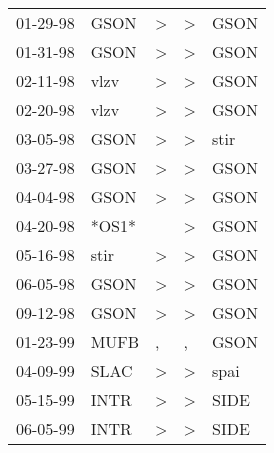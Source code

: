 \begin{supertabular}{lllll}
 01-29-98 &   GSON &  \textgreater &  \textgreater &  GSON \\
 01-31-98 &   GSON &  \textgreater &  \textgreater &  GSON \\
 02-11-98 &   vlzv &  \textgreater &  \textgreater &  GSON \\
 02-20-98 &   vlzv &  \textgreater &  \textgreater &  GSON \\
 03-05-98 &   GSON &  \textgreater &  \textgreater &  stir \\
 03-27-98 &   GSON &  \textgreater &  \textgreater &  GSON \\
 04-04-98 &   GSON &  \textgreater &  \textgreater &  GSON \\
 04-20-98 &  *OS1* &               &  \textgreater &  GSON \\
 05-16-98 &   stir &  \textgreater &  \textgreater &  GSON \\
 06-05-98 &   GSON &  \textgreater &  \textgreater &  GSON \\
 09-12-98 &   GSON &  \textgreater &  \textgreater &  GSON \\
 01-23-99 &   MUFB &             , &             , &  GSON \\
 04-09-99 &   SLAC &  \textgreater &  \textgreater &  spai \\
 05-15-99 &   INTR &  \textgreater &  \textgreater &  SIDE \\
 06-05-99 &   INTR &  \textgreater &  \textgreater &  SIDE \\
\end{supertabular}

